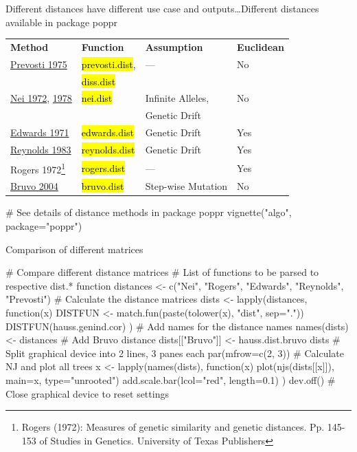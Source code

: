 \documentclass[compress, ucs, xelatex, 11pt, xcolor=svgnames,
  hyperref={
    bookmarks=true,
    unicode=true,
    colorlinks=true,
    pdftitle={Molecular data in R},
    plainpages=false,
    pdfauthor={Vojtech Zeisek},
    pdfsubject={Course about phylogeny and evolution in R},
    pdfcreator={XeLaTeX},
    pdfkeywords={R, evolution, phylogeny, molecular data},
    linkcolor=Tomato,
    anchorcolor=SaddleBrown,
    citecolor=Goldenrod,
    filecolor=DarkMagenta,
    menucolor=Sienna,
    urlcolor=DarkTurquoise,
    pdftex},
  url={hyphens, lowtilde} %
  ]{beamer}
\renewcommand{\texttt}[1]{\hl{\ttfamily #1}}
\begin{document}
\begin{frame}[fragile]{Different distances have different use case and outputs\ldots}{Different distances available in package poppr}
  \vfill
  \begin{tabular}{llll}
    \textbf{Method} & \textbf{Function} & \textbf{Assumption} & \textbf{Euclidean}\\
    \href{https://link.springer.com/article/10.1007/BF00831894}{Prevosti 1975} & \texttt{prevosti.dist}, & --- & \alert{No}\\
     & \texttt{diss.dist} & & \\
    \href{https://www.jstor.org/stable/2459777}{Nei 1972}, \href{http://www.genetics.org/content/89/3/583.short}{1978} & \texttt{nei.dist} & Infinite Alleles, & \alert{No}\\
     & & Genetic Drift & \\
    \href{https://www.jstor.org/stable/2528824}{Edwards 1971} & \texttt{edwards.dist} & Genetic Drift & Yes\\
    \href{http://www.genetics.org/node/324318.full}{Reynolds 1983} & \texttt{reynolds.dist} & Genetic Drift & Yes\\
    Rogers 1972\footnote{Rogers (1972): Measures of genetic similarity and genetic distances. Pp. 145-153 of Studies in Genetics. University of Texas Publishers} & \texttt{rogers.dist} & --- & Yes\\
    \href{http://onlinelibrary.wiley.com/doi/10.1111/j.1365-294X.2004.02209.x/full}{Bruvo 2004} & \texttt{bruvo.dist} & Step-wise Mutation & \alert{No}
  \end{tabular}
  \vfill
  \begin{spluscode}
    # See details of distance methods in package poppr
    vignette("algo", package="poppr")
  \end{spluscode}
  \vfill
\end{frame}

\begin{frame}[fragile]{Comparison of different matrices}
  \begin{spluscode}
    # Compare different distance matrices
    # List of functions to be parsed to respective dist.* function
    distances <- c("Nei", "Rogers", "Edwards", "Reynolds", "Prevosti")
    # Calculate the distance matrices
    dists <- lapply(distances, function(x) {
      DISTFUN <- match.fun(paste(tolower(x), "dist", sep="."))
      DISTFUN(hauss.genind.cor) })
    # Add names for the distance names
    names(dists) <- distances
    # Add Bruvo distance
    dists[["Bruvo"]] <- hauss.dist.bruvo
    dists
    # Split graphical device into 2 lines, 3 panes each
    par(mfrow=c(2, 3))
    # Calculate NJ and plot all trees
    x <- lapply(names(dists), function(x) {
      plot(njs(dists[[x]]), main=x, type="unrooted")
      add.scale.bar(lcol="red", length=0.1) })
    dev.off() # Close graphical device to reset settings
  \end{spluscode}
\end{frame}
\end{document}
